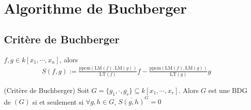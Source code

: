     \section{Algorithme de Buchberger}
        \subsection{Critère de Buchberger}
            \begin{defi}
                $f,g \in k[x_1, \cdots, x_n]$, alors
                \begin{align*}
                    S(f,g) := \frac{\mathrm{ppcm} (\mathrm{LM}(f), \mathrm{LM}(g))}{\mathrm{LT}(f)}f - \frac{\mathrm{ppcm} (\mathrm{LM}(f), \mathrm{LM}(g))}{\mathrm{LT}(g)}g
                \end{align*}
            \end{defi}
            \begin{theo} (Critère de Buchberger)
                Soit $G = \{g_1, \cdot, g_r\} \subseteq k[x_1, \cdots, x_r]$. Alors $G$ est une BDG de $(G)$ si et seulement si $\forall g,h \in G$, $\overline{S(g,h)}^G = 0$
            \end{theo}  